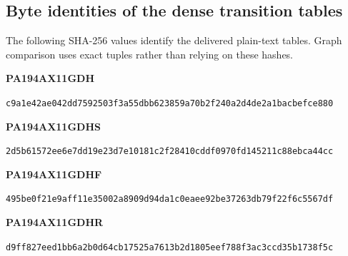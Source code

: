\subsection{Byte identities of the dense transition tables}
The following SHA-256 values identify the delivered plain-text tables. Graph comparison uses exact tuples rather than relying on these hashes.
\par\noindent\begin{minipage}{\linewidth}
\textbf{PA194AX11GDH}\par
{\small\nolinkurl{c9a1e42ae042dd7592503f3a55dbb623859a70b2f240a2d4de2a1bacbefce880}}
\end{minipage}\par
\par\noindent\begin{minipage}{\linewidth}
\textbf{PA194AX11GDHS}\par
{\small\nolinkurl{2d5b61572ee6e7dd19e23d7e10181c2f28410cddf0970fd145211c88ebca44cc}}
\end{minipage}\par
\par\noindent\begin{minipage}{\linewidth}
\textbf{PA194AX11GDHF}\par
{\small\nolinkurl{495be0f21e9aff11e35002a8909d94da1c0eaee92be37263db79f22f6c5567df}}
\end{minipage}\par
\par\noindent\begin{minipage}{\linewidth}
\textbf{PA194AX11GDHR}\par
{\small\nolinkurl{d9ff827eed1bb6a2b0d64cb17525a7613b2d1805eef788f3ac3ccd35b1738f5c}}
\end{minipage}\par
